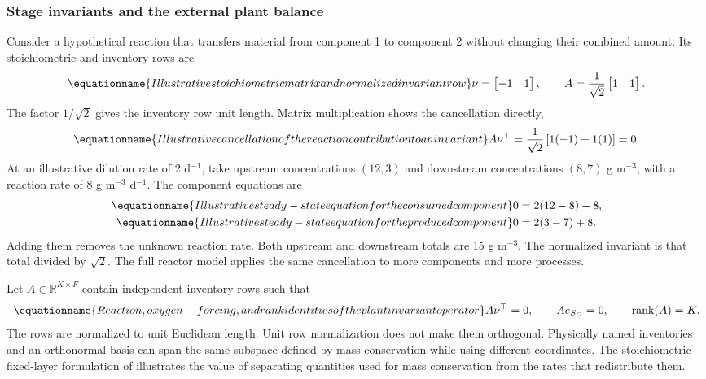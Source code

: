 \subsubsection{Stage invariants and the external plant balance}

Consider a hypothetical reaction that transfers material from component 1 to component 2 without changing their combined amount. Its stoichiometric and inventory rows are
\begin{equation}
\equationname{Illustrative stoichiometric matrix and normalized invariant row}
\nu=\begin{bmatrix}-1&1\end{bmatrix},\qquad
A=\frac1{\sqrt2}\begin{bmatrix}1&1\end{bmatrix}.
\end{equation}
The factor $1/\sqrt2$ gives the inventory row unit length. Matrix multiplication shows the cancellation directly,
\begin{equation}
\equationname{Illustrative cancellation of the reaction contribution to an invariant}
A\nu^\top=\frac1{\sqrt2}\left[1(-1)+1(1)\right]=0.
\end{equation}
At an illustrative dilution rate of 2 d$^{-1}$, take upstream concentrations $(12,3)$ and downstream concentrations $(8,7)$ g m$^{-3}$, with a reaction rate of 8 g m$^{-3}$ d$^{-1}$. The component equations are
\begin{align}
\equationname{Illustrative steady-state equation for the consumed component}
0&=2(12-8)-8,\\
\equationname{Illustrative steady-state equation for the produced component}
0&=2(3-7)+8.
\end{align}
Adding them removes the unknown reaction rate. Both upstream and downstream totals are 15 g m$^{-3}$. The normalized invariant is that total divided by $\sqrt2$. The full reactor model applies the same cancellation to more components and more processes.

Let $A\in\mathbb R^{K\times F}$ contain independent inventory rows such that
\begin{equation}
\equationname{Reaction, oxygen-forcing, and rank identities of the plant invariant operator}
A\nu^\top=0,\qquad Ae_{S_O}=0,\qquad
\operatorname{rank}(A)=K.
\label{eq:plant_invariant_operator}
\end{equation}
The rows are normalized to unit Euclidean length. Unit row normalization does not make them orthogonal. Physically named inventories and an orthonormal basis can span the same subspace defined by mass conservation while using different coordinates. The stoichiometric fixed-layer formulation of \citet{SturmWexler2022} illustrates the value of separating quantities used for mass conservation from the rates that redistribute them.

